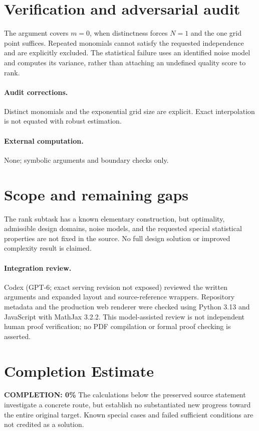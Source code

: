 \documentclass[11pt]{article}
\begin{document}
\section{Verification and adversarial audit}
The argument covers $m=0$, when distinctness forces $N=1$ and the one grid point suffices. Repeated monomials cannot satisfy the requested independence and are explicitly excluded. The statistical failure uses an identified noise model and computes its variance, rather than attaching an undefined quality score to rank.
\paragraph{Audit corrections.} Distinct monomials and the exponential grid size are explicit. Exact interpolation is not equated with robust estimation.
\paragraph{External computation.} None; symbolic arguments and boundary checks only.
\section{Scope and remaining gaps}
The rank subtask has a known elementary construction, but optimality, admissible design domains, noise models, and the requested special statistical properties are not fixed in the source. No full design solution or improved complexity result is claimed.
\paragraph{Integration review.} Codex (GPT-6; exact serving revision not exposed) reviewed the written arguments and expanded layout and source-reference wrappers. Repository metadata and the production web renderer were checked using Python 3.13 and JavaScript with MathJax 3.2.2. This model-assisted review is not independent human proof verification; no PDF compilation or formal proof checking is asserted.

\section{Completion Estimate}
\noindent\textbf{COMPLETION: 0\%}
The calculations below the preserved source statement investigate a concrete route,
but establish no substantiated new progress toward the entire original target.
Known special cases and failed sufficient conditions are not credited as a solution.
\end{document}

